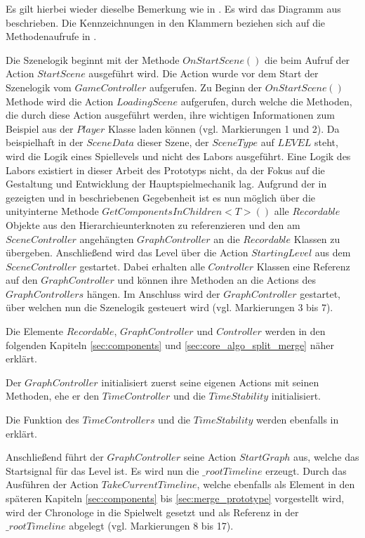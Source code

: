 Es gilt hierbei wieder dieselbe Bemerkung wie in . Es wird das Diagramm aus  beschrieben. Die Kennzeichnungen in den Klammern beziehen sich auf die Methodenaufrufe in .

Die Szenelogik beginnt mit der Methode $OnStartScene()$ die beim Aufruf der Action $StartScene$ ausgeführt wird. Die Action wurde vor dem Start der Szenelogik vom $GameController$ aufgerufen. Zu Beginn der $OnStartScene()$ Methode wird die Action $LoadingScene$ aufgerufen, durch welche die Methoden, die durch diese Action ausgeführt werden, ihre wichtigen Informationen zum Beispiel aus der $Player$ Klasse laden können (vgl. Markierungen 1 und 2). Da beispielhaft in der $SceneData$ dieser Szene, der $SceneType$ auf $LEVEL$ steht, wird die Logik eines Spiellevels und nicht des Labors ausgeführt. Eine Logik des Labors existiert in dieser Arbeit des Prototyps nicht, da der Fokus auf die Gestaltung und Entwicklung der Hauptspielmechanik lag. Aufgrund der in  gezeigten und in  beschriebenen Gegebenheit ist es nun möglich über die unityinterne Methode $GetComponentsInChildren<T>()$ alle $Recordable$ Objekte aus den Hierarchieunterknoten zu referenzieren und den am $SceneController$ angehängten $GraphController$ an die $Recordable$ Klassen zu übergeben. Anschließend wird das Level über die Action $StartingLevel$ aus dem $SceneController$ gestartet. Dabei erhalten alle $Controller$ Klassen eine Referenz auf den $GraphController$ und können ihre Methoden an die Actions des $GraphControllers$ hängen. Im Anschluss wird der $GraphController$ gestartet, über welchen nun die Szenelogik gesteuert wird (vgl. Markierungen 3 bis 7).

Die Elemente $Recordable$, $GraphController$ und $Controller$ werden in den folgenden Kapiteln \ref{sec:components} und \ref{sec:core_algo_split_merge} näher erklärt.

Der $GraphController$ initialisiert zuerst seine eigenen Actions mit seinen Methoden, ehe er den $TimeController$ und die $TimeStability$ initialisiert. 

Die Funktion des $TimeControllers$ und die $TimeStability$ werden ebenfalls in  erklärt.

Anschließend führt der $GraphController$ seine Action $StartGraph$ aus, welche das Startsignal für das Level ist. Es wird nun die $\_rootTimeline$ erzeugt. Durch das Ausführen der Action $TakeCurrentTimeline$, welche ebenfalls als Element in den späteren Kapiteln \ref{sec:components} bis \ref{sec:merge_prototype} vorgestellt wird, wird der Chronologe in die Spielwelt gesetzt und als Referenz in der $\_rootTimeline$ abgelegt (vgl. Markierungen 8 bis 17).

